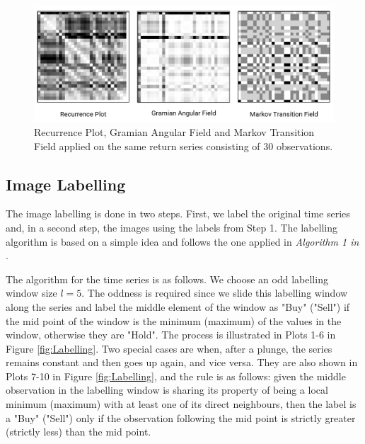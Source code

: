 \documentclass[11pt, a4paper]{article}
\begin{document}
\begin{figure}[]
    \centering
    \includegraphics[width=\textwidth]{images/allTrf.PNG}
    \caption{Recurrence Plot, Gramian Angular Field and Markov Transition Field applied on the same return series consisting of 30 observations.}
    \label{fig:allTrf}
\end{figure}

\subsection{Image Labelling}
\label{subsec:DM:IL}
The image labelling is done in two steps. First, we label the original time series and, in a second step, the images using the labels from Step 1.
The labelling algorithm is based on a simple idea and follows the one applied in \textit{Algorithm 1 in} \cite{sezer2018algorithmic}.

The algorithm for the time series is as follows. We choose an odd labelling window size $l = 5$. The oddness is required since we slide this labelling window along the series and label the middle element of the window as "Buy" ("Sell") if the mid point of the window is the minimum (maximum) of the values in the window, otherwise they are "Hold". The process is illustrated in Plots 1-6 in Figure \ref{fig:Labelling}. 
Two special cases are when, after a plunge, the series remains constant and then goes up again, and vice versa. They are also shown in Plots 7-10 in Figure \ref{fig:Labelling}, and the rule is as follows: 
given the middle observation in the labelling window is sharing its property of being a local minimum (maximum) with at least one of its direct neighbours, then the label is a "Buy" ("Sell") only if the observation following the mid point is strictly greater (strictly less) than the mid point.
\end{document}
